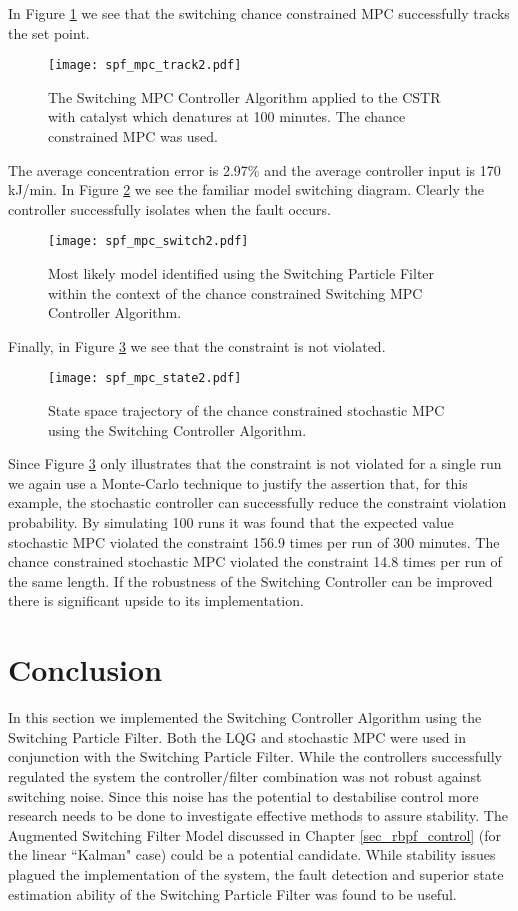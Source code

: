In Figure \ref{fig_spf_mpc_track2} we see that the switching chance constrained MPC successfully tracks the set point.
\begin{figure}[H] 
\centering
\texttt{[image: spf\_mpc\_track2.pdf]}
\caption{The Switching MPC Controller Algorithm applied to the CSTR with catalyst which denatures at 100 minutes. The chance constrained MPC was used.}
\label{fig_spf_mpc_track2}
\end{figure}
The average concentration error is 2.97\% and the average controller input is 170 kJ/min. In Figure \ref{fig_spf_mpc_switch2} we see the familiar model switching diagram. Clearly the controller successfully isolates when the fault occurs.
\begin{figure}[H] 
\centering
\texttt{[image: spf\_mpc\_switch2.pdf]}
\caption{Most likely model identified using the Switching Particle Filter within the context of the chance constrained Switching MPC Controller Algorithm.}
\label{fig_spf_mpc_switch2}
\end{figure}
Finally, in Figure \ref{fig_spf_mpc_state2} we see that the constraint is not violated.
\begin{figure}[H] 
\centering
\texttt{[image: spf\_mpc\_state2.pdf]}
\caption{State space trajectory of the chance constrained stochastic MPC using the Switching Controller Algorithm.}
\label{fig_spf_mpc_state2}
\end{figure}
Since Figure \ref{fig_spf_mpc_state2} only illustrates that the constraint is not violated for a single run we again use a Monte-Carlo technique to justify the assertion that, for this example, the stochastic controller can successfully reduce the constraint violation probability. By simulating 100 runs it was found that the expected value stochastic MPC violated the constraint 156.9 times per run of 300 minutes. The chance constrained stochastic MPC violated the constraint 14.8 times per run of the same length. If the robustness of the Switching Controller can be improved there is significant upside to its implementation.

\section{Conclusion}
In this section we implemented the Switching Controller Algorithm using the Switching Particle Filter. Both the LQG and stochastic MPC were used in conjunction with the Switching Particle Filter. While the controllers successfully regulated the system the controller/filter combination was not robust against switching noise. Since this noise has the potential to destabilise control more research needs to be done to investigate effective methods to assure stability. The Augmented Switching Filter Model discussed in Chapter \ref{sec_rbpf_control} (for the linear ``Kalman" case) could be a potential candidate. While stability issues plagued the implementation of the system, the fault detection and superior state estimation ability of the Switching Particle Filter was found to be useful.



